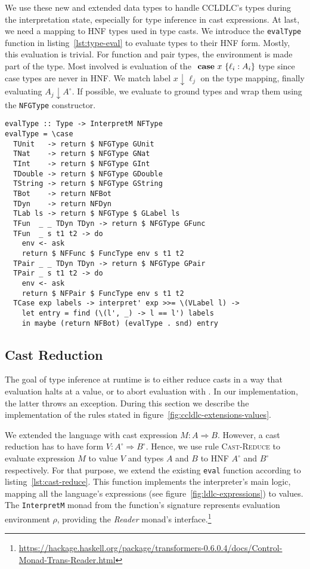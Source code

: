 We use these new and extended data types to handle CCLDLC's types during the interpretation state, especially for type inference in cast expressions. At last, we need a mapping to HNF types used in type casts. We introduce the \texttt{evalType} function in listing~\ref{lst:type-eval} to evaluate types to their HNF form. Mostly, this evaluation is trivial. For function and pair types, the environment is made part of the type. Most involved is evaluation of the $\text{ \textbf{case} } x~\{\ell_i : A_i\}$ type since case types are never in HNF. We match label $x \downarrow \ell_j$ on the type mapping, finally evaluating $A_j \downarrow A^\circ$. If possible, we evaluate to ground types and wrap them using the \texttt{NFGType} constructor.

\begin{lstlisting}[float,
  caption=Type evaluation (\texttt{Interpreter.hs}),
  label=lst:type-eval]
evalType :: Type -> InterpretM NFType
evalType = \case
  TUnit   -> return $ NFGType GUnit
  TNat    -> return $ NFGType GNat
  TInt    -> return $ NFGType GInt
  TDouble -> return $ NFGType GDouble
  TString -> return $ NFGType GString
  TBot    -> return NFBot
  TDyn    -> return NFDyn
  TLab ls -> return $ NFGType $ GLabel ls
  TFun  _ _ TDyn TDyn -> return $ NFGType GFunc
  TFun  _ s t1 t2 -> do
    env <- ask
    return $ NFFunc $ FuncType env s t1 t2
  TPair _ _ TDyn TDyn -> return $ NFGType GPair
  TPair _ s t1 t2 -> do
    env <- ask
    return $ NFPair $ FuncType env s t1 t2
  TCase exp labels -> interpret' exp >>= \(VLabel l) ->
    let entry = find (\(l', _) -> l == l') labels
    in maybe (return NFBot) (evalType . snd) entry
\end{lstlisting}

\subsection{Cast Reduction}

The goal of type inference at runtime is to either reduce casts in a way that evaluation halts at a value, or to abort evaluation with \blame. In our implementation, the latter throws an exception. During this section we describe the implementation of the rules stated in figure~\ref{fig:ccldlc-extensions-values}.

We extended the language with cast expression $M : A \Rightarrow B$. However, a cast reduction has to have form $V : A^\circ \Rightarrow B^\circ$. Hence, we use rule \textsc{Cast-Reduce} to evaluate expression $M$ to value $V$ and types $A$ and $B$ to HNF $A^\circ$ and $B^\circ$ respectively. For that purpose, we extend the existing \texttt{eval} function according to listing~\ref{lst:cast-reduce}. This function implements the interpreter's main logic, mapping all the language's expressions (see figure~\ref{fig:ldlc-expressions}) to values. The \texttt{InterpretM} monad from the function's signature represents evaluation environment $\rho$, providing the \emph{Reader} monad's interface.\footnote{\url{https://hackage.haskell.org/package/transformers-0.6.0.4/docs/Control-Monad-Trans-Reader.html}}


